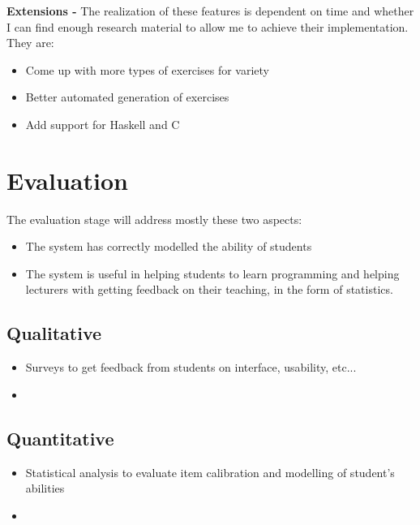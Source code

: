 \documentclass[11pt,a4paper]{report}
\begin{document}
\textbf{Extensions -} The realization of these features is dependent on time and whether I can find enough research material to allow me to achieve their implementation. They are:
\begin{itemize}
\item Come up with more types of exercises for variety
\item Better automated generation of exercises
\item Add support for Haskell and C
\end{itemize}


\chapter{Evaluation}
The evaluation stage will address mostly these two aspects:
\begin{itemize}
\item The system has correctly modelled the ability of students
\item The system is useful in helping students to learn programming and helping lecturers with getting feedback on their teaching, in the form of statistics.
\end{itemize}

\section{Qualitative}
\begin{itemize}
\item Surveys to get feedback from students on interface, usability, etc...
\item 
\end{itemize}

\section{Quantitative}
\begin{itemize}
\item Statistical analysis to evaluate item calibration and modelling of student's abilities
\item 
\end{itemize}

\end{document}
